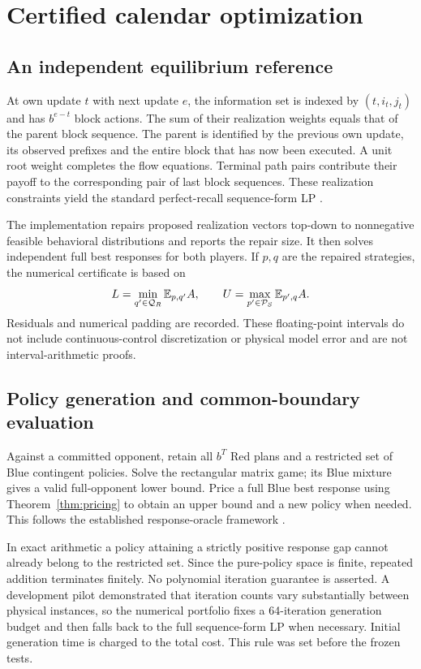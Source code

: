 \section{Certified calendar optimization}\label{sec:algorithm}

\subsection{An independent equilibrium reference}
At own update $t$ with next update $e$, the information set is indexed by
$(t,i_t,j_t)$ and has $b^{e-t}$ block actions. The sum of their realization
weights equals that of the parent block sequence. The parent is identified
by the previous own update, its observed prefixes and the entire block
that has now been executed. A unit root weight completes the flow equations.
Terminal path pairs contribute their payoff to the corresponding pair of
last block sequences. These realization constraints yield the standard
perfect-recall sequence-form LP \citep{stengel1996}.

The implementation repairs proposed realization vectors top-down to
nonnegative feasible behavioral distributions and reports the repair size.
It then solves independent full best responses for both players. If $p,q$
are the repaired strategies, the numerical certificate is based on
\begin{equation}
 L=\min_{q'\in\mathcal Q_R}\mathbb E_{p,q'}A,
 \qquad U=\max_{p'\in\mathcal P_S}\mathbb E_{p',q}A.
 \label{eq:responses}
\end{equation}
Residuals and numerical padding are recorded. These floating-point
intervals do not include continuous-control discretization or physical
model error and are not interval-arithmetic proofs.

\subsection{Policy generation and common-boundary evaluation}
Against a committed opponent, retain all $b^T$ Red plans and a restricted
set of Blue contingent policies. Solve the rectangular matrix game; its
Blue mixture gives a valid full-opponent lower bound. Price a full Blue
best response using Theorem~\ref{thm:pricing} to obtain an upper bound and
a new policy when needed. This follows the established response-oracle
framework \citep{mcmahan2003,bosansky2014}.

In exact arithmetic a policy attaining a strictly positive response gap
cannot already belong to the restricted set. Since the pure-policy space
is finite, repeated addition terminates finitely. No polynomial iteration
guarantee is asserted. A development pilot demonstrated that iteration
counts vary substantially between physical instances, so the numerical
portfolio fixes a 64-iteration generation budget and then falls back to
the full sequence-form LP when necessary. Initial generation time is
charged to the total cost. This rule was set before the frozen tests.

